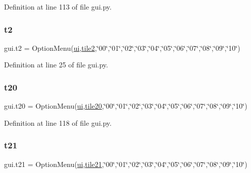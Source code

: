 Definition at line 113 of file gui.\+py.

\mbox{\label{namespacegui_a97744d56325244bb6b67797f5929f2f4}} 
\subsubsection{\texorpdfstring{t2}{t2}}
{\footnotesize\ttfamily gui.\+t2 = Option\+Menu(\mbox{\hyperlink{namespacegui_a40ab7281456eadbea2dc2038f5c24fa1}{ui}},\mbox{\hyperlink{namespacegui_a53f57a204bf56c498146081b29ab8750}{tile2}},\char`\"{}00\char`\"{},\char`\"{}01\char`\"{},\char`\"{}02\char`\"{},\char`\"{}03\char`\"{},\char`\"{}04\char`\"{},\char`\"{}05\char`\"{},\char`\"{}06\char`\"{},\char`\"{}07\char`\"{},\char`\"{}08\char`\"{},\char`\"{}09\char`\"{},\char`\"{}10\char`\"{})}



Definition at line 25 of file gui.\+py.

\mbox{\label{namespacegui_a007d194e3cc41d5c441d2839bcc37e82}} 
\subsubsection{\texorpdfstring{t20}{t20}}
{\footnotesize\ttfamily gui.\+t20 = Option\+Menu(\mbox{\hyperlink{namespacegui_a40ab7281456eadbea2dc2038f5c24fa1}{ui}},\mbox{\hyperlink{namespacegui_a2096e825e084bbcf0aa95f3d23080035}{tile20}},\char`\"{}00\char`\"{},\char`\"{}01\char`\"{},\char`\"{}02\char`\"{},\char`\"{}03\char`\"{},\char`\"{}04\char`\"{},\char`\"{}05\char`\"{},\char`\"{}06\char`\"{},\char`\"{}07\char`\"{},\char`\"{}08\char`\"{},\char`\"{}09\char`\"{},\char`\"{}10\char`\"{})}



Definition at line 118 of file gui.\+py.

\mbox{\label{namespacegui_a5966de5cb8f4ee1c0c9351cc875b9ade}} 
\subsubsection{\texorpdfstring{t21}{t21}}
{\footnotesize\ttfamily gui.\+t21 = Option\+Menu(\mbox{\hyperlink{namespacegui_a40ab7281456eadbea2dc2038f5c24fa1}{ui}},\mbox{\hyperlink{namespacegui_a498c43445669c1b252d5fcaab91b94d1}{tile21}},\char`\"{}00\char`\"{},\char`\"{}01\char`\"{},\char`\"{}02\char`\"{},\char`\"{}03\char`\"{},\char`\"{}04\char`\"{},\char`\"{}05\char`\"{},\char`\"{}06\char`\"{},\char`\"{}07\char`\"{},\char`\"{}08\char`\"{},\char`\"{}09\char`\"{},\char`\"{}10\char`\"{})}



